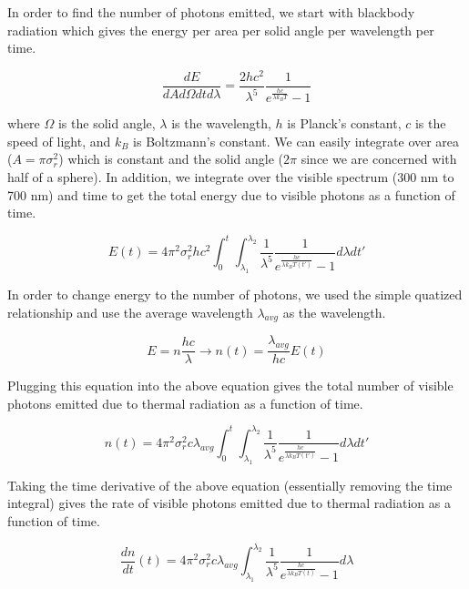 \documentclass[12pt]{article}
\begin{document}
In order to find the number of photons emitted, we start with blackbody radiation which gives the energy per area per solid angle per wavelength per time.

\begin{equation}
\frac{dE}{dA d \Omega dt d \lambda} = \frac{2 h c^2}{\lambda^{5}} \frac{1}{e^{\frac{hc}{\lambda k_B T}}-1}
\end{equation}

where $\Omega$ is the solid angle, $\lambda$ is the wavelength, $h$ is Planck's constant, $c$ is the speed of light, and $k_B$ is Boltzmann's constant. We can easily integrate over area ($A=\pi \sigma_r^2$) which is constant and the solid angle ($2 \pi$ since we are concerned with half of a sphere). In addition, we integrate over the visible spectrum (300 nm to 700 nm) and time to get the total energy due to visible photons as a function of time.

\begin{equation}
E(t)=4 \pi^2 \sigma_r^2 h c^2 \int_0^t \int_{\lambda_1}^{\lambda_2} \frac{1}{\lambda^{5}} \frac{1}{e^{\frac{hc}{\lambda k_B T(t')}}-1} d \lambda dt'
\end{equation}

In order to change energy to the number of photons, we used the simple quatized relationship and use the average wavelength $\lambda_{avg}$ as the wavelength.

\begin{equation}
E=n \frac{hc}{\lambda} \rightarrow n(t)=\frac{\lambda_{avg}}{hc} E(t)
\end{equation}

Plugging this equation into the above equation gives the total number of visible photons emitted due to thermal radiation as a function of time.

\begin{equation}
n(t)=4 \pi^2 \sigma_r^2 c \lambda_{avg} \int_0^t \int_{\lambda_1}^{\lambda_2} \frac{1}{\lambda^{5}} \frac{1}{e^{\frac{hc}{\lambda k_B T(t')}}-1} d \lambda dt'
\end{equation}

Taking the time derivative of the above equation (essentially removing the time integral) gives the rate of visible photons emitted due to thermal radiation as a function of time.

\begin{equation}
\frac{dn}{dt}(t)=4 \pi^2 \sigma_r^2 c \lambda_{avg} \int_{\lambda_1}^{\lambda_2} \frac{1}{\lambda^{5}} \frac{1}{e^{\frac{hc}{\lambda k_B T(t)}}-1} d \lambda
\end{equation}
\end{document}
